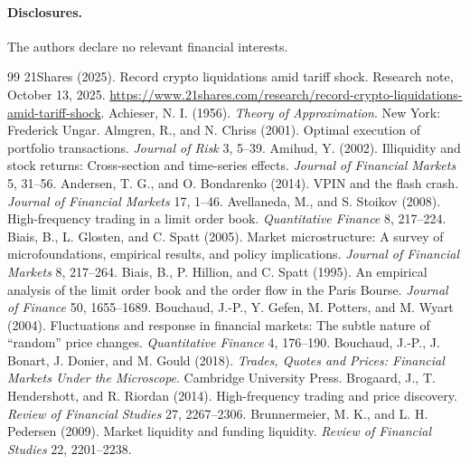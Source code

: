 \documentclass[12pt]{article}
\theoremstyle{definition}
\theoremstyle{remark}
\begin{document}
\paragraph{Disclosures.} The authors declare no relevant financial interests.
\begin{thebibliography}{99}\setlength{\itemsep}{0pt}\small
{} 21Shares (2025). Record crypto liquidations amid tariff shock. Research note, October 13, 2025. \url{https://www.21shares.com/research/record-crypto-liquidations-amid-tariff-shock}.
 Achieser, N. I. (1956). \emph{Theory of Approximation}. New York: Frederick Ungar.
 Almgren, R., and N. Chriss (2001). Optimal execution of portfolio transactions. \emph{Journal of Risk} 3, 5--39.
 Amihud, Y. (2002). Illiquidity and stock returns: Cross-section and time-series effects. \emph{Journal of Financial Markets} 5, 31--56.
 Andersen, T. G., and O. Bondarenko (2014). VPIN and the flash crash. \emph{Journal of Financial Markets} 17, 1--46.
 Avellaneda, M., and S. Stoikov (2008). High-frequency trading in a limit order book. \emph{Quantitative Finance} 8, 217--224.
 Biais, B., L. Glosten, and C. Spatt (2005). Market microstructure: A survey of microfoundations, empirical results, and policy implications. \emph{Journal of Financial Markets} 8, 217--264.
 Biais, B., P. Hillion, and C. Spatt (1995). An empirical analysis of the limit order book and the order flow in the Paris Bourse. \emph{Journal of Finance} 50, 1655--1689.
 Bouchaud, J.-P., Y. Gefen, M. Potters, and M. Wyart (2004). Fluctuations and response in financial markets: The subtle nature of ``random'' price changes. \emph{Quantitative Finance} 4, 176--190.
 Bouchaud, J.-P., J. Bonart, J. Donier, and M. Gould (2018). \emph{Trades, Quotes and Prices: Financial Markets Under the Microscope}. Cambridge University Press.
 Brogaard, J., T. Hendershott, and R. Riordan (2014). High-frequency trading and price discovery. \emph{Review of Financial Studies} 27, 2267--2306.
 Brunnermeier, M. K., and L. H. Pedersen (2009). Market liquidity and funding liquidity. \emph{Review of Financial Studies} 22, 2201--2238.

\end{thebibliography}
\end{document}
